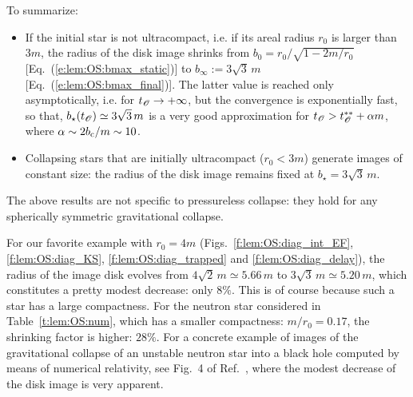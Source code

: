 To summarize:

\begin{greybox}
\begin{itemize}
\item If the initial star is not ultracompact, i.e. if its areal radius
$r_0$ is larger than $3 m$,
the radius of the disk image shrinks from $b_0 = r_0 / \sqrt{1 - 2m/r_0}$
[Eq.~(\ref{e:lem:OS:bmax_static})]
to $b_\infty := 3\sqrt{3} \, m$ [Eq.~(\ref{e:lem:OS:bmax_final})].
The latter value is reached only asymptotically, i.e. for $t_{\mathscr{O}}\to +\infty$,
but the convergence is exponentially fast, so that, $b_\star(t_{\mathscr{O}}) \simeq 3\sqrt{3} \, m$
is a very good approximation for $t_{\mathscr{O}} > t_{\mathscr{O}}^{**} + \alpha m$, where $\alpha \sim 2 b_{\rm c}/m
\sim 10 $.
\item Collapsing stars that are initially ultracompact
($r_0 < 3 m$) generate images of constant size: the radius of the disk image
remains fixed at $b_\star = 3\sqrt{3} \, m$.
\end{itemize}
\end{greybox}

\begin{remark}
The above results are not specific to pressureless collapse: they
hold for any spherically symmetric gravitational collapse.
\end{remark}

\begin{example}
For our favorite example with $r_0 = 4m$ (Figs.~\ref{f:lem:OS:diag_int_EF},
\ref{f:lem:OS:diag_KS}, \ref{f:lem:OS:diag_trapped} and \ref{f:lem:OS:diag_delay}),
the radius of the image disk evolves from $4\sqrt{2} \, m\simeq 5.66\, m$ to
$3\sqrt{3}\, m \simeq 5.20\, m$, which constitutes a pretty modest
decrease: only $8\%$. This is of course because such a star has a large compactness.
For the neutron star considered in Table~\ref{t:lem:OS:num}, which has a
smaller compactness: $m/r_0 = 0.17$, the shrinking factor is higher: $28\%$.
For a concrete example of images of the gravitational collapse of an unstable neutron star into a black hole computed by means of numerical relativity, see
Fig.~4 of Ref.~\cite{VinceGN12}, where the modest decrease of the disk image
is very apparent.
\end{example}

